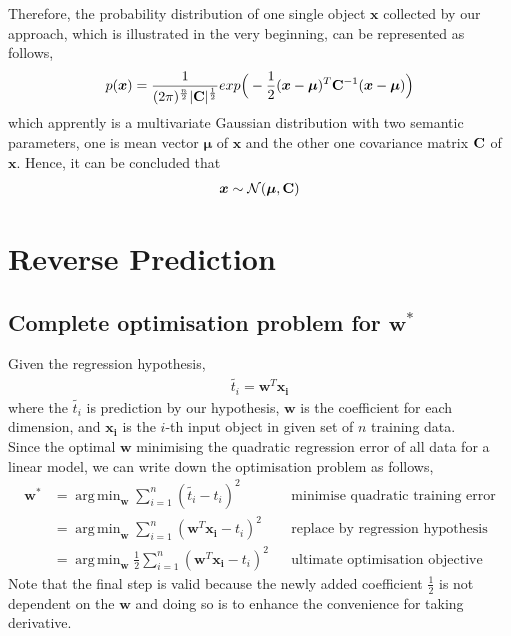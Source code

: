 \documentclass[11pt,a4paper]{article}
\newcommand{\htab}{\hspace*{0.63cm}}
\newcommand{\bs}[1]{\boldsymbol{#1}}
\newcommand{\bmu}{\boldsymbol{\mu}}
\newcommand{\bx}{\boldsymbol{x}}
\newcommand{\N}{\mathcal{N}}
\newcommand{\half}{\frac{1}{2}}
\DeclareMathOperator*{\argmin}{arg\,min}
\begin{document}
\htab Therefore, the probability distribution of one single object $\bs{x}$ collected 
by our approach, which is illustrated in the very beginning, can be represented as follows,
\begin{align}
    p(\bx) = 
     \frac{1}{(2\pi)^{\frac{n}{2}} |\C|^{\half} }
        exp\Big( - \half  (\bx - \bmu)^{T} \C^{-1} (\bx - \bmu)  \Big)
    \end{align}
\htab which apprently is a multivariate Gaussian distribution with two semantic parameters,
one is mean vector $\bmu$ of $\bs{x}$ and the other one covariance matrix $\mathbf{C}$ of $\bs{x}$. 
Hence, it can be concluded that 
\begin{align}
    \bx \sim \N (\bmu, \C)
    \end{align}
\newpage
\section{Reverse Prediction}
\newcommand{\ww}{\boldsymbol{w}}
\newcommand{\wws}{\boldsymbol{w}^{*}}
\newcommand{\wwt}{\boldsymbol{w}^{T}}
\newcommand{\xxi}{\boldsymbol{x_{i}} }
\newcommand{\xxib}{\overset{\sim}{\xxi}}
\newcommand{\XX}{\boldsymbol{X}}
\newcommand{\XXt}{\boldsymbol{X}^{T}}
\newcommand{\XXi}{\boldsymbol{X}^{-1}}
\newcommand{\tti}{t_{i}}
\newcommand{\TT}{\boldsymbol{t}}
\newcommand{\TTt}{\boldsymbol{t}^{T}}
\newcommand{\uus}{\boldsymbol{u}^{*}}
\newcommand{\uu}{\boldsymbol{u}}
\subsection{Complete optimisation problem for $\wws$}
\htab Given the regression hypothesis, 
\begin{align}
    \widetilde{\tti} = \wwt \xxi
    \end{align}
\htab where the $\widetilde{\tti}$ is prediction by our hypothesis, $\ww$ is the coefficient for 
each dimension, and $\xxi$ is the $i$-th input object in given set of $n$ training data. \\
\htab Since the optimal $\ww$ minimising the quadratic regression error of all data for a linear model,
we can write down the optimisation problem as follows,
    \begin{align}
        \wws 
        &= \argmin_{\ww} \sum_{i=1}^{n} (\widetilde{\tti} - \tti)^{2} 
        &&\mbox{minimise quadratic training error} \\
        &= \argmin_{\ww} \sum_{i=1}^{n} (\wwt \xxi - \tti)^{2} 
        &&\mbox{replace by regression hypothesis}\\
        &= \argmin_{\ww} \half \sum_{i=1}^{n} (\wwt \xxi - \tti)^{2} 
        &&\mbox{ultimate optimisation objective}
    \end{align}
\htab Note that the final step is valid because the newly added coefficient $\half$ is 
not dependent on the $\ww$ and doing so is to enhance the convenience for taking derivative.
\end{document}

